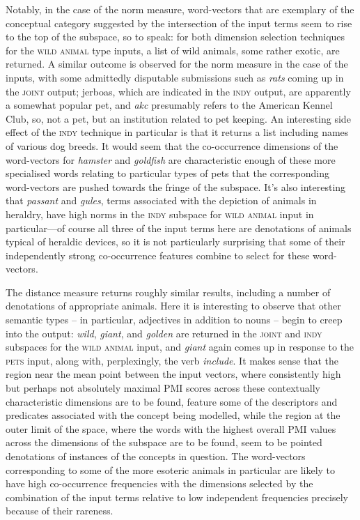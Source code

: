 Notably, in the case of the norm measure, word-vectors that are exemplary of the conceptual category suggested by the intersection of the input terms seem to rise to the top of the subspace, so to speak: for both dimension selection techniques for the \textsc{wild animal} type inputs, a list of wild animals, some rather exotic, are returned.  A similar outcome is observed for the norm measure in the case of the  inputs, with some admittedly disputable submissions such as \emph{rats} coming up in the \textsc{joint} output; jerboas, which are indicated in the \textsc{indy} output, are apparently a somewhat popular pet, and \emph{akc} presumably refers to the American Kennel Club, so, not a pet, but an institution related to pet keeping.  An interesting side effect of the \textsc{indy} technique in particular is that it returns a list including names of various dog breeds.  It would seem that the co-occurrence dimensions of the word-vectors for \emph{hamster} and \emph{goldfish} are characteristic enough of these more specialised words relating to particular types of pets that the corresponding word-vectors are pushed towards the fringe of the subspace.  It's also interesting that \emph{passant} and \emph{gules}, terms associated with the depiction of animals in heraldry, have high norms in the \textsc{indy} subspace for \textsc{wild animal} input in particular---of course all three of the input terms here are denotations of animals typical of heraldic devices, so it is not particularly surprising that some of their independently strong co-occurrence features combine to select for these word-vectors.

The distance measure returns roughly similar results, including a number of denotations of appropriate animals.  Here it is interesting to observe that other semantic types -- in particular, adjectives in addition to nouns -- begin to creep into the output: \emph{wild}, \emph{giant}, and \emph{golden} are returned in the \textsc{joint} and \textsc{indy} subspaces for the \textsc{wild animal} input, and \emph{giant} again comes up in response to the \textsc{pets} input, along with, perplexingly, the verb \emph{include}.  It makes sense that the region near the mean point between the input vectors, where consistently high but perhaps not absolutely maximal PMI scores across these contextually characteristic dimensions are to be found, feature some of the descriptors and predicates associated with the concept being modelled, while the region at the outer limit of the space, where the words with the highest overall PMI values across the dimensions of the subspace are to be found, seem to be pointed denotations of instances of the concepts in question.  The word-vectors corresponding to some of the more esoteric animals in particular are likely to have high co-occurrence frequencies with the dimensions selected by the combination of the input terms relative to low independent frequencies precisely because of their rareness.

